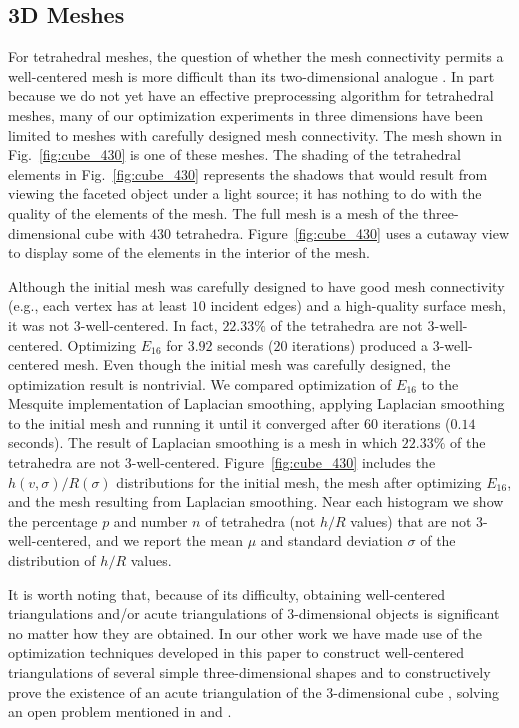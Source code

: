\documentclass[final]{siamltex}
\begin{document}
\subsection{3D Meshes} \label{subsec:3dresult}

For tetrahedral meshes, the question of whether the mesh connectivity
permits a well-centered mesh is more difficult than its
two-dimensional analogue \cite{VaHiGuRaZh2008}. In part because we do
not yet have an effective preprocessing algorithm for tetrahedral
meshes, many of our optimization experiments in three dimensions have
been limited to meshes with carefully designed mesh connectivity.
The mesh shown in Fig.~\ref{fig:cube_430} is one of these meshes.
The shading of the tetrahedral elements in Fig.~\ref{fig:cube_430}
represents the shadows that would result from viewing
the faceted object under a light source; it has nothing
to do with the quality of the elements of the mesh.  The full
mesh is a mesh of the three-dimensional cube with $430$ tetrahedra.
Figure~\ref{fig:cube_430} uses a cutaway view to display some
of the elements in the interior of the mesh.



Although the initial mesh was carefully designed to have good
mesh connectivity (e.g., each vertex has at least $10$ incident
edges) and a high-quality surface mesh, it was not $3$-well-centered.
In fact, $22.33\%$ of the tetrahedra are not $3$-well-centered.
Optimizing $E_{16}$ for $3.92$ seconds ($20$ iterations) produced
a $3$-well-centered mesh.  Even though the initial mesh was carefully
designed, the optimization result is nontrivial.  We compared
optimization of $E_{16}$ to the Mesquite implementation of Laplacian
smoothing, applying Laplacian smoothing to the initial mesh and
running it until it converged after $60$ iterations
($0.14$ seconds).  The result of Laplacian
smoothing is a mesh in which $22.33\%$ of the tetrahedra are not
$3$-well-centered.  Figure~\ref{fig:cube_430} includes
the $h(v, \sigma)/R(\sigma)$ distributions for the initial mesh,
the mesh after optimizing $E_{16}$, and the mesh resulting from
Laplacian smoothing.  Near each histogram we show the percentage $p$
and number $n$ of tetrahedra (not $h/R$ values) that are not
$3$-well-centered, and we report the mean $\mu$ and standard
deviation $\sigma$ of the distribution of $h/R$ values.

It is worth noting that, because of its
difficulty, obtaining well-centered
triangulations and/or acute triangulations of $3$-dimensional
objects is significant no matter how they are obtained.
In our other work we have made use of the optimization
techniques developed in this paper to
construct well-centered triangulations of several
simple three-dimensional shapes \cite{VaHiGu2008} and to
constructively prove the existence of an acute triangulation
of the $3$-dimensional cube \cite{VaHiZhGu2009}, solving
an open problem mentioned in \cite{EpSuUn2004} and
\cite{BrKoKrSo2009}.
\end{document}
